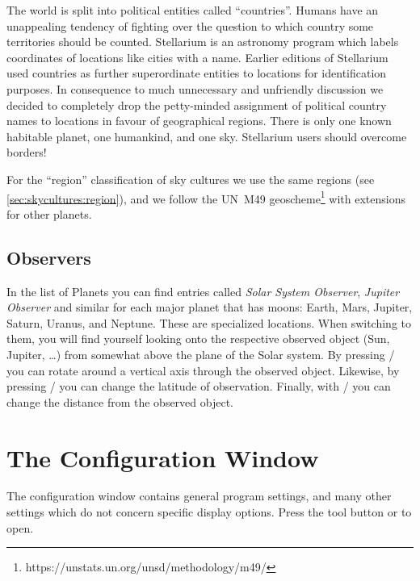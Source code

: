 The world is split into political entities called ``countries''.  
Humans have an unappealing tendency of fighting over the question to which 
country some territories should be counted. Stellarium is an astronomy 
program which labels coordinates of locations like cities with a name. 
Earlier editions of Stellarium used countries as further superordinate 
entities to locations for identification purposes. In consequence to much 
unnecessary and unfriendly discussion we decided to completely drop the 
petty-minded assignment of political country names to locations in favour 
of geographical regions. There is only one known habitable planet, one 
humankind, and one sky. Stellarium users should overcome borders! 

For the ``region'' classification of sky cultures we use the same regions (see \ref{sec:skycultures:region}), 
and we follow the UN~M49 geoscheme\footnote{https://unstats.un.org/unsd/methodology/m49/} with extensions for other planets.

\subsection{Observers}
\label{sec:gui:location:observers}

In the list of Planets you can find entries called \emph{Solar System Observer}, \emph{Jupiter Observer} and 
similar for each major planet that has moons: Earth, Mars, Jupiter, Saturn, Uranus, and Neptune. 
These are specialized locations. When switching to them, you will find yourself looking 
onto the respective observed object (Sun, Jupiter, \ldots) from somewhat above the plane of the Solar system. 
By pressing \key{\Alt+\arrowkeyleft}/\key{\Alt+\arrowkeyright} you can rotate around a vertical axis through the observed object.
Likewise, by pressing \key{\Alt+\arrowkeyup}/\key{\Alt+\arrowkeydown} you can change the latitude of observation. Finally, 
with / you can change the distance from the observed object. 


\section{The Configuration Window}
\label{sec:gui:configuration}

The configuration window contains general program settings, and many
other settings which do not concern specific display options. Press
the tool button  or  to open.


